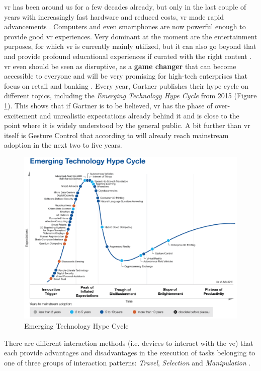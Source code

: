 \gls{vr} has been around us for a few decades already, but only in the last couple of years with increasingly fast hardware and reduced costs, \gls{vr} made rapid advancements \citep{vrs2015}. Computers and even smartphones are now powerful enough to provide good \gls{vr} experiences.\newline
Very dominant at the moment are the entertainment purposes, for which \gls{vr} is currently mainly utilized, but it can also go beyond that and provide profound educational experiences if curated with the right content \citep{Safrudin2015}. \gls{vr} even should be seen as disruptive, as a \textbf{game changer} that can become accessible to everyone and will be very promising for high-tech enterprises that focus on retail and banking \citep{Safrudin2015}. \newline
Every year, Gartner publishes their hype cycle on different topics, including the \textit{Emerging Technology Hype Cycle} from 2015 (Figure \ref{fig:hypecycle}). This shows that if Gartner is to be believed, \gls{vr} has the phase of over-excitement and unrealistic expectations already behind it and is close to the point where it is widely understood by the general public. A bit further than \gls{vr} itself is Gesture Control that according to \cite{Gartner2015} will already reach mainstream adoption in the next two to five years.
\begin{figure}[h]
	\begin{center}
		\includegraphics[width=14cm]{03_Figures/03_Gartner/Gartner_EmergingTech2015.png}
		\caption[Emerging Technology Hype Cycle]{Emerging Technology Hype Cycle \citep{Gartner2015b}}
		\label{fig:hypecycle}
	\end{center}
\end{figure} \newline
There are different interaction methods (i.e. devices to interact with the \gls{ve}) that each provide advantages and disadvantages in the execution of tasks belonging to one of three groups of interaction patterns: \textit{Travel}, \textit{Selection} and \textit{Manipulation} \citep{Bowman2002}. 


